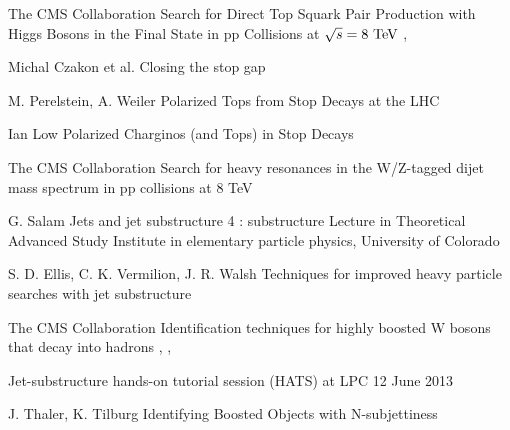 {The CMS Collaboration}
{Search for Direct Top Squark Pair Production with Higgs Bosons in the Final
State in pp Collisions at $\sqrt{s} = 8~\text{TeV}$}
{, }

{Michal Czakon et al.}
{Closing the stop gap}
{}

{M. Perelstein, A. Weiler}
{Polarized Tops from Stop Decays at the LHC}
{}

{Ian Low}
{Polarized Charginos (and Tops) in Stop Decays}
{}


{The CMS Collaboration}
{Search for heavy resonances in the W/Z-tagged dijet mass
spectrum in pp collisions at 8 TeV}
{}

{G. Salam}
{Jets and jet substructure 4 : substructure}
{Lecture in Theoretical Advanced Study Institute in elementary particle physics,
University of Colorado}

{S. D. Ellis, C. K. Vermilion, J. R. Walsh}
{Techniques for improved heavy particle searches with jet substructure}
{}

{The CMS Collaboration}
{Identification techniques for highly boosted W bosons that decay into hadrons}
{, , }

{}
{Jet-substructure hands-on tutorial session (HATS) at LPC}
{12 June 2013}

{J. Thaler, K. Tilburg}
{Identifying Boosted Objects with N-subjettiness}
{}



